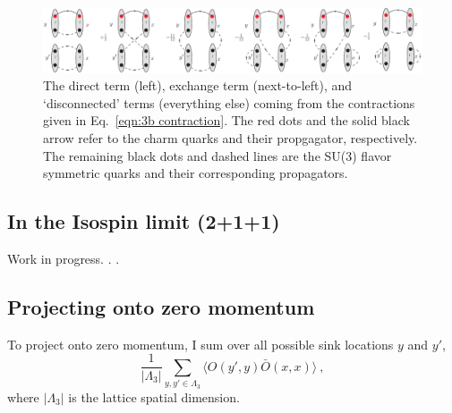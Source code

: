 \documentclass[11pt]{article}
\begin{document}
\begin{figure}
\center
\includegraphics[width=\columnwidth]{contract3.eps}
\caption{The direct term (left), exchange term (next-to-left), and `disconnected' terms (everything else) coming from the contractions given in Eq.~\eqref{eqn:3b contraction}.  The red dots and the solid black arrow refer to the charm quarks and their propgagator, respectively.  The remaining black dots and dashed lines are the SU(3) flavor symmetric quarks and their corresponding propagators. \label{fig:3b}}
\end{figure}

\subsection{In the Isospin limit (2+1+1)}
Work in progress. . .

\subsection{Projecting onto zero momentum}
To project onto zero momentum, I sum over all possible sink locations $y$ and $y'$,
\begin{displaymath}
\frac{1}{|\Lambda_3|}\sum_{y,y'\in\Lambda_3}\langle O(y',y)\bar O(x,x)\rangle\ ,
\end{displaymath}
where $|\Lambda_3|$ is the lattice spatial dimension.




%
\end{document}
